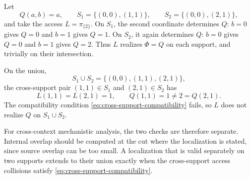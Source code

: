 \begin{example}
\label{ex:local-not-global}
Let
\[
Q(a,b)=a,
\qquad
S_1=\{(0,0),(1,1)\},
\qquad
S_2=\{(0,0),(2,1)\},
\]
and take the access $L=\pi_{\{2\}}$. On $S_1$, the second coordinate determines $Q$: $b=0$ gives $Q=0$ and $b=1$ gives $Q=1$. On $S_2$, it again determines $Q$: $b=0$ gives $Q=0$ and $b=1$ gives $Q=2$. Thus $L$ realizes $\Phi=Q$ on each support, and trivially on their intersection.

On the union,
\[
S_1\cup S_2
=
\{(0,0),(1,1),(2,1)\},
\]
the cross-support pair $(1,1)\in S_1$ and $(2,1)\in S_2$ has
\[
L(1,1)=L(2,1)=1,
\qquad
Q(1,1)=1\neq 2=Q(2,1).
\]
The compatibility condition \eqref{eq:cross-support-compatibility} fails, so $L$ does not realize $Q$ on $S_1\cup S_2$.
\end{example}

For cross-context mechanistic analysis, the two checks are therefore separate. Internal overlap should be computed at the cut where the localization is stated, since source overlap can be too small. A localization that is valid separately on two supports extends to their union exactly when the cross-support access collisions satisfy \eqref{eq:cross-support-compatibility}.
